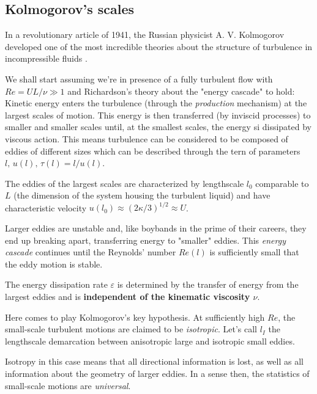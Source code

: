 \subsection{Kolmogorov's scales}
In a revolutionary article of 1941, the Russian physicist A. V. Kolmogorov developed one of the most incredible theories about the structure of turbulence in incompressible fluids \cite{1991RSPSA.434....9K}.
\par We shall start assuming we're in presence of a fully turbulent flow with $Re = UL/\nu \gg 1$ and Richardson's theory about the "energy cascade" to hold: Kinetic energy enters the turbulence (through the \emph{production} mechanism) at the largest scales of motion. This energy is then transferred (by inviscid processes) to smaller and smaller scales until, at the smallest scales, the energy si dissipated by viscous action. This means turbulence can be considered to be composed of eddies of different sizes which can be described through the tern of parameters $l,\,u(l),\,\tau(l)=l/u(l)$.
\par The eddies of the largest scales are characterized by lengthscale $l_{0}$ comparable to $L$ (the dimension of the system housing the turbulent liquid) and have characteristic velocity $u(l_{0}) \approx (2\kappa/3)^{1/2}\approx U$.
\par Larger eddies are unstable and, like boybands in the prime of their careers, they end up breaking apart, transferring energy to "smaller" eddies. This \emph{energy cascade} continues until the Reynolds' number $Re(l)$ is sufficiently small that the eddy motion is stable.
\par The energy dissipation rate $\varepsilon$ is determined by the transfer of energy from the largest eddies and is \textbf{independent of the kinematic viscosity $\nu$}.
\par Here comes to play Kolmogorov's key hypothesis. At sufficiently high $Re$, the small-scale turbulent motions are claimed to be \emph{isotropic}. Let's call $l_{I}$ the lengthscale demarcation between anisotropic large and isotropic small eddies.
\par Isotropy in this case means that all directional information is lost, as well as all information about the geometry of larger eddies. In a sense then, the statistics of small-scale motions are \emph{universal}.
